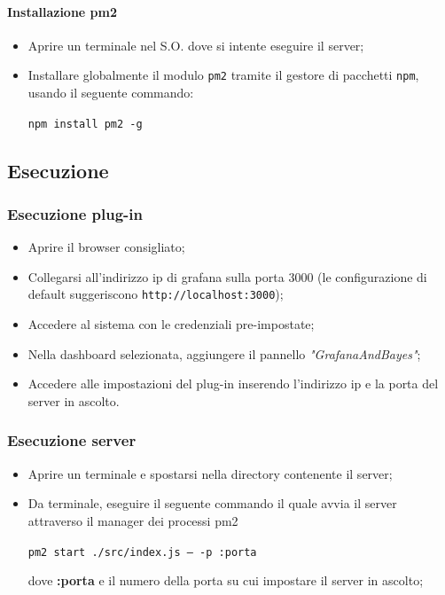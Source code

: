 \paragraph{Installazione pm2}
\begin{itemize}
	\item Aprire un terminale nel S.O. dove si intente eseguire il server; 
	\item Installare globalmente il modulo \texttt{pm2} tramite il gestore di pacchetti \texttt{npm}, usando il seguente commando: 
	\begin{center}
		\texttt{npm install pm2 -g}
	\end{center}
\end{itemize}
		


	
	
\subsection{Esecuzione}\label{run}
\subsubsection{Esecuzione plug-in}
\begin{itemize}
	\item Aprire il browser consigliato; 
	\item Collegarsi all'indirizzo ip di grafana sulla porta 3000 (le configurazione di default suggeriscono \texttt{http://localhost:3000}); 
	\item Accedere al sistema con le credenziali pre-impostate; 
	\item Nella dashboard selezionata, aggiungere il pannello \textit{"GrafanaAndBayes"}; 
	\item Accedere alle impostazioni del plug-in inserendo l'indirizzo ip e la porta del server in ascolto. 
\end{itemize}


\subsubsection{Esecuzione server}
\begin{itemize}
	\item Aprire un terminale e spostarsi nella directory contenente il server; 
	\item Da terminale, eseguire il seguente commando il quale avvia il server attraverso il manager dei processi pm2
	\begin{center}
		\texttt{pm2 start ./src/index.js --- -p :porta}
	\end{center}
	dove \textbf{:porta} e il numero della porta su cui impostare il server in ascolto; 
\end{itemize}
	
	
	
	
	
	
	
	
	
	
	
	
	
	
	
	
	
	
	
	
	